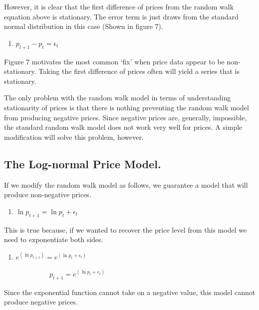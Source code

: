 \documentclass[
]{book}
\providecommand{\tightlist}{%
  \setlength{\itemsep}{0pt}\setlength{\parskip}{0pt}}
\begin{document}
However, it is clear that the first difference of prices from the random walk equation above is stationary. The error term is just draws from the standard normal distribution in this case (Shown in figure 7).

\begin{enumerate}
\def\labelenumi{(\arabic{enumi})}
\setcounter{enumi}{3}
\tightlist
\item
  \(p_{t+1} - p_{t} = \epsilon_t\)
\end{enumerate}

Figure 7 motivates the most common `fix' when price data appear to be non-stationary. Taking the first difference of prices often will yield a series that is stationary.

The only problem with the random walk model in terms of understanding stationarity of prices is that there is nothing preventing the random walk model from producing negative prices. Since negative prices are, generally, impossible, the standard random walk model does not work very well for prices. A simple modification will solve this problem, however.

\hypertarget{the-log-normal-price-model.}{%
\subsection{The Log-normal Price Model.}\label{the-log-normal-price-model.}}

If we modify the random walk model as follows, we guarantee a model that will produce non-negative prices.

\begin{enumerate}
\def\labelenumi{(\arabic{enumi})}
\setcounter{enumi}{4}
\tightlist
\item
  \(\ln{p_{t+1}} = \ln{p_{t}} + \epsilon_t\)
\end{enumerate}

This is true because, if we wanted to recover the price level from this model we need to exponentiate both sides.

\begin{enumerate}
\def\labelenumi{(\arabic{enumi})}
\setcounter{enumi}{5}
\tightlist
\item
  \(e^{(\ln{p_{t+1}})} = e^{(\ln{p_{t}} + \epsilon_t)}\)
\end{enumerate}

~~~~~~~~~~~~~\(p_{t+1} = e^{(\ln{p_{t}} + \epsilon_t)}\)

Since the exponential function cannot take on a negative value, this model cannot produce negative prices.
\end{document}
